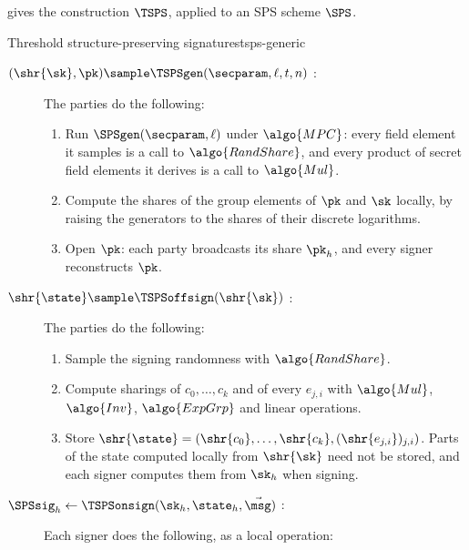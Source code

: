 gives the construction $\TSPS$, applied to an SPS
scheme $\SPS$.

\begin{protocolbox}{Threshold structure-preserving signatures}{tsps-generic}

  \begin{description}

    \item[$(\shr{\sk}, \pk) \sample \TSPSgen(\secparam, \ell, t, n)$ :] The
parties do the following:

      \begin{enumerate}

	\item Run $\SPSgen(\secparam, \ell)$ under $\algo{MPC}$: every field
element it samples is a call to $\algo{RandShare}$, and every product of secret
field elements it derives is a call to $\algo{Mul}$.

	\item Compute the shares of the group elements of $\pk$ and $\sk$
locally, by raising the generators to the shares of their discrete logarithms.

	\item Open $\pk$: each party broadcasts its share $\pk_h$, and every
signer reconstructs $\pk$.

      \end{enumerate}

    \item[$\shr{\state} \sample \TSPSoffsign(\shr{\sk})$ :] The parties do the
following:

      \begin{enumerate}

	\item Sample the signing randomness with $\algo{RandShare}$.

	\item Compute sharings of $c_0, \ldots, c_k$ and of every $e_{j,i}$ with
$\algo{Mul}$, $\algo{Inv}$, $\algo{ExpGrp}$ and linear operations.

	\item Store $\shr{\state} = (\shr{c_0}, \ldots, \shr{c_k},
(\shr{e_{j,i}})_{j,i})$. Parts of the state computed locally from $\shr{\sk}$
need not be stored, and each signer computes them from $\sk_h$ when signing.

      \end{enumerate}

    \item[$\SPSsig_h \leftarrow \TSPSonsign(\sk_h, \state_h, \vec{\msg})$ :]
Each signer does the following, as a local operation:


\end{description}
\end{protocolbox}

